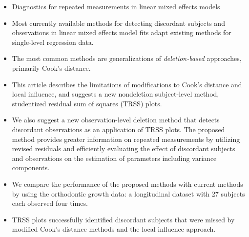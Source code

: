\documentclass[Main.tex]{subfiles}
\begin{document}
\begin{itemize}
\item Diagnostics for repeated measurements in linear mixed effects models
\item Most currently available methods for detecting discordant subjects and observations in linear mixed effects model fits adapt existing methods for single-level regression data.

\item The most common methods are generalizations of \emph{deletion-based} approaches, primarily Cook's distance. 
\item This article describes the limitations of modifications to Cook's distance and local influence, and suggests a 
new nondeletion subject-level method, studentized residual sum of squares (TRSS) plots. 

\item We also suggest a new observation-level deletion method that detects discordant observations as an application of TRSS plots. The proposed method provides greater information on repeated measurements by utilizing revised residuals and efficiently evaluating the effect of discordant subjects and observations on the estimation of parameters including variance components. 

\item We compare the performance of the proposed methods with current methods by using the orthodontic growth data: a longitudinal dataset with 27 subjects each observed four times.
\item TRSS plots successfully identified discordant subjects that were missed by
modified Cook's distance methods and the local influence approach. 
\end{itemize}
\end{document}
